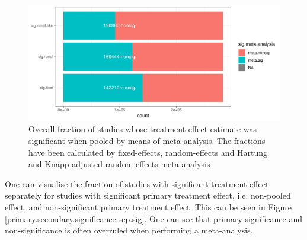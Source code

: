 \documentclass[11pt,a4paper,twoside]{book}\usepackage[]{graphicx}\usepackage[]{color}
\newenvironment{knitrout}{}{} %
\begin{document}
\begin{figure}
\begin{knitrout}
\color{fgcolor}

{\centering \includegraphics[width=\textwidth-3cm]{figure/ch02_figunnamed-chunk-19-1} 

}



\end{knitrout}
\caption{Overall fraction of studies whose treatment effect estimate was significant when pooled by means of meta-analysis. The fractions have been calculated
by fixed-effects, random-effects and Hartung and Knapp adjusted random-effects meta-analysis}
\label{primary.secondary.significance}
\end{figure}

One can visualise the fraction of studies with significant treatment effect separately for studies with significant primary treatment effect, i.e. non-pooled effect, and non-significant primary treatment effect. This can be seen in Figure \ref{primary.secondary.significance.sep.sig}. One can see that primary significance and non-significance is often overruled when performing a meta-analysis.
\end{document}
